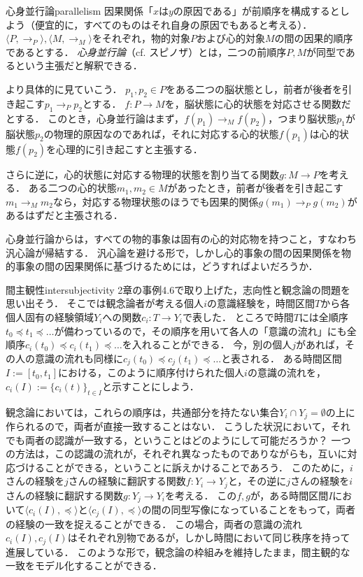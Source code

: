 \documentclass[dvipdfmx,11pt,a4paper]{jsarticle}
\begin{document}
\begin{rei}{心身並行論}{parallelism}
因果関係「$x$は$y$の原因である」が前順序を構成するとしよう（便宜的に，すべてのものはそれ自身の原因でもあると考える）．
$\langle P, \to_P \rangle, \langle M, \to_M \rangle$をそれぞれ，物的対象$P$および心的対象$M$の間の因果的順序であるとする．
\emph{心身並行論}（cf. スピノザ）とは，二つの前順序$P, M$が同型であるという主張だと解釈できる．

より具体的に見ていこう．
$p_1, p_2 \in P$をある二つの脳状態とし，前者が後者を引き起こす$p_1 \to_P p_2$とする．
$f: P \to M$を，脳状態に心的状態を対応させる関数だとする．
このとき，心身並行論はまず，$f(p_1) \to_M f(p_2)$，つまり脳状態$p_1$が脳状態$p_2$の物理的原因なのであれば，それに対応する心的状態$f(p_1)$は心的状態$f(p_2)$を心理的に引き起こすと主張する．

さらに逆に，心的状態に対応する物理的状態を割り当てる関数$g: M \to P$を考える．
ある二つの心的状態$m_1, m_2 \in M$があったとき，前者が後者を引き起こす$m_1 \to_M m_2$なら，対応する物理状態のほうでも因果的関係$g(m_1) \to_P g(m_2)$があるはずだと主張される．
\end{rei}

\begin{hatten}{}{}
心身並行論からは，すべての物的事象は固有の心的対応物を持つこと，すなわち汎心論が帰結する．
汎心論を避ける形で，しかし心的事象の間の因果関係を物的事象の間の因果関係に基づけるためには，どうすればよいだろうか．
\end{hatten}

\begin{rei}{間主観性}{intersubjectivity}
2章の事例4.6で取り上げた，志向性と観念論の問題を思い出そう．
そこでは観念論者が考える個人$i$の意識経験を，時間区間$T$から各個人固有の経験領域$Y_i$への関数$c_i:T \to Y_i$で表した．
ところで時間$T$には全順序$t_0 \preceq t_1 \preceq \dots$が備わっているので，その順序を用いて各人の「意識の流れ」にも全順序$c_i(t_0) \preceq c_i(t_1) \preceq \dots$を入れることができる．
今，別の個人$j$があれば，その人の意識の流れも同様に$c_j(t_0) \preceq c_j(t_1) \preceq \dots$と表される．
ある時間区間$I := [t_0, t_1]$における，このように順序付けられた個人$i$の意識の流れを，$c_i(I) := \{c_i(t)\}_{t \in I}$と示すことにしよう．

観念論においては，これらの順序は，共通部分を持たない集合$Y_i \cap Y_j = \emptyset$の上に作られるので，両者が直接一致することはない．
こうした状況において，それでも両者の認識が一致する，ということはどのようにして可能だろうか？
一つの方法は，この認識の流れが，それぞれ異なったものでありながらも，互いに対応づけることができる，ということに訴えかけることであろう．
このために，$i$さんの経験を$j$さんの経験に翻訳する関数$f: Y_i \to Y_j$と，その逆に$j$さんの経験を$i$さんの経験に翻訳する関数$g: Y_j \to Y_i$を考える．
この$f, g$が，ある時間区間$I$において$\langle c_i(I), \preceq \rangle$と$\langle c_j(I), \preceq \rangle$の間の同型写像になっていることをもって，両者の経験の一致を捉えることができる．
この場合，両者の意識の流れ$c_i(I), c_j(I)$はそれぞれ別物であるが，しかし時間において同じ秩序を持って進展している．
このような形で，観念論の枠組みを維持したまま，間主観的な一致をモデル化することができる．
\end{rei}
\end{document}
